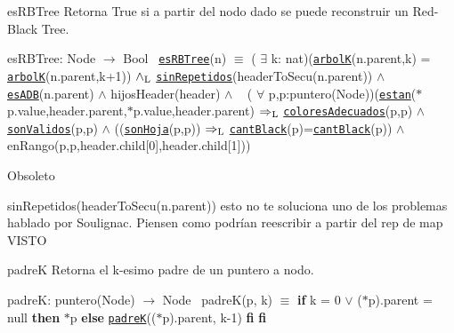 \begin{DoxyParagraph}{es\+R\+B\+Tree}
Retorna True si a partir del nodo dado se puede reconstruir un Red-\/\+Black Tree.

es\+R\+B\+Tree\+: Node $\to$ Bool~\newline
 \href{axiomas.html#esRBTree}{\tt es\+R\+B\+Tree}(n) $\equiv$ ( $\exists$ k\+: nat)(\href{axiomas.html#arbolK}{\tt arbolK}(n.\+parent,k) = \href{axiomas.html#arbolK}{\tt arbolK}(n.\+parent,k+1)) $\land_{\rm L}$ \href{axiomas.html#sinRepetidos}{\tt sin\+Repetidos}(header\+To\+Secu(n.\+parent)) $\land$ \href{axiomas.html#esADB}{\tt es\+A\+DB}(n.\+parent) $\land$ hijos\+Header(header) $\land$ ~\newline
 ( $\forall$ p,p\textquotesingle{}\+:puntero(\+Node))(\href{axiomas.html#estan}{\tt estan}($\ast$p.value,header.\+parent,$\ast$p\textquotesingle{}.value,header.\+parent) $\Rightarrow_{\rm L}$ \href{axiomas.html#coloresAdecuados}{\tt colores\+Adecuados}(p,p\textquotesingle{}) $\land$ ~\newline
 \href{axiomas.html#sonValidos}{\tt son\+Validos}(p,p\textquotesingle{}) $\land$ ((\href{axiomas.html#sonHoja}{\tt son\+Hoja}(p,p\textquotesingle{})) $\Rightarrow_{\rm L}$ \href{axiomas.html#cantBlack}{\tt cant\+Black}(p)=\href{axiomas.html#cantBlack}{\tt cant\+Black}(p\textquotesingle{})) $\land$ en\+Rango(p,p\textquotesingle{},header.\+child\mbox{[}0\mbox{]},header.\+child\mbox{[}1\mbox{]})) 
\end{DoxyParagraph}


\begin{DoxyRefDesc}{Obsoleto}
\item[\hyperlink{deprecated__deprecated000002}{Obsoleto}]sin\+Repetidos(header\+To\+Secu(n.\+parent)) esto no te soluciona uno de los problemas hablado por Soulignac. Piensen como podrían reescribir a partir del rep de map V\+I\+S\+TO\end{DoxyRefDesc}


\begin{DoxyParagraph}{padreK}
Retorna el k-\/esimo padre de un puntero a nodo.

padreK\+: puntero(\+Node) $\to$ Node~\newline
 padre\+K(p, k) $\equiv$ {\bfseries if} k = 0 $\lor$ ($\ast$p).parent = null {\bfseries then} $\ast$p {\bfseries else} \href{axiomas.html#padreK}{\tt padreK}(($\ast$p).parent, k-\/1) {\bfseries fi} {\bfseries fi} 
\end{DoxyParagraph}


